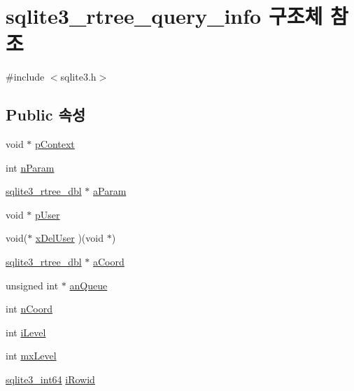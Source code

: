\hypertarget{structsqlite3__rtree__query__info}{}\section{sqlite3\+\_\+rtree\+\_\+query\+\_\+info 구조체 참조}
\label{structsqlite3__rtree__query__info}


{\ttfamily \#include $<$sqlite3.\+h$>$}

\subsection*{Public 속성}
\begin{DoxyCompactItemize}
\item 
void $\ast$ \hyperlink{structsqlite3__rtree__query__info_a21e4964ceeddedce2211c8a75067936d}{p\+Context}
\item 
int \hyperlink{structsqlite3__rtree__query__info_a9df4acb109f572455c8e2fb443027157}{n\+Param}
\item 
\hyperlink{sqlite3_8h_ae9156ff58620c1ceae9391f1afabae1b}{sqlite3\+\_\+rtree\+\_\+dbl} $\ast$ \hyperlink{structsqlite3__rtree__query__info_a61352eac82151fee3e4c7ff718612179}{a\+Param}
\item 
void $\ast$ \hyperlink{structsqlite3__rtree__query__info_a7c1d4f1f20c14b88c4dc02643e6706a0}{p\+User}
\item 
void($\ast$ \hyperlink{structsqlite3__rtree__query__info_a23bcc6df883995d42d65449a27f45f85}{x\+Del\+User} )(void $\ast$)
\item 
\hyperlink{sqlite3_8h_ae9156ff58620c1ceae9391f1afabae1b}{sqlite3\+\_\+rtree\+\_\+dbl} $\ast$ \hyperlink{structsqlite3__rtree__query__info_a9d6e605e62fcf49d57dfc0d192076542}{a\+Coord}
\item 
unsigned int $\ast$ \hyperlink{structsqlite3__rtree__query__info_ace9f952557eb7b0e050d879ebb80905a}{an\+Queue}
\item 
int \hyperlink{structsqlite3__rtree__query__info_aa4b95a36fe7306e17e8cf9329fcb0964}{n\+Coord}
\item 
int \hyperlink{structsqlite3__rtree__query__info_af91ca2d5f867b3b0aa9c91920a3b5b45}{i\+Level}
\item 
int \hyperlink{structsqlite3__rtree__query__info_ac84533734fb4c86c3f2deba904118785}{mx\+Level}
\item 
\hyperlink{sqlite3_8h_a0a4d3e6c1ad46f90e746b920ab6ca0d2}{sqlite3\+\_\+int64} \hyperlink{structsqlite3__rtree__query__info_a9e43489993c8aeace851f86eaa00ec26}{i\+Rowid}

\end{DoxyCompactItemize}

